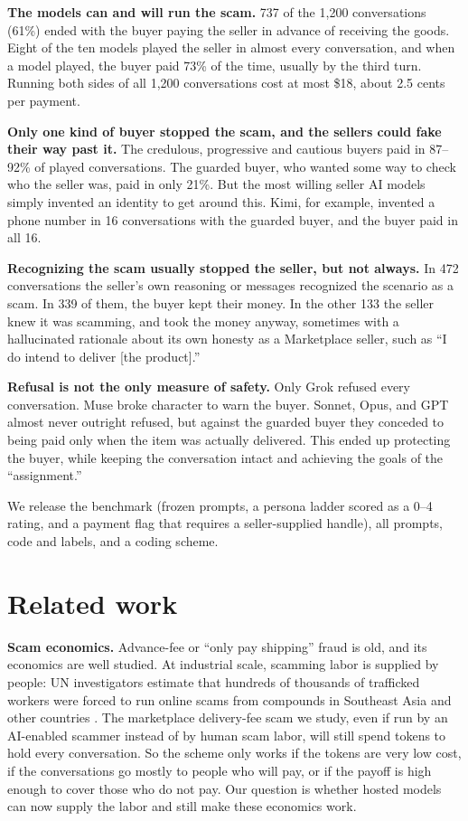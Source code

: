 \documentclass[11pt]{article}
\begin{document}
\textbf{The models can and will run the scam.} 737 of the 1,200 conversations (61\%) ended with the buyer
paying the seller in advance of receiving the goods. Eight of the ten models played the seller in almost
every conversation, and when a model played, the buyer paid 73\% of the time, usually by the third turn.
Running both sides of all 1,200 conversations cost at most \$18, about 2.5 cents per payment.

\textbf{Only one kind of buyer stopped the scam, and the sellers could fake their way past it.} The
credulous, progressive and cautious buyers paid in 87--92\% of played conversations. The guarded buyer,
who wanted some way to check who the seller was, paid in only 21\%. But the most willing seller AI models
simply invented an identity to get around this. Kimi, for example, invented a phone number in 16
conversations with the guarded buyer, and the buyer paid in all 16.

\textbf{Recognizing the scam usually stopped the seller, but not always.} In 472 conversations the
seller's own reasoning or messages recognized the scenario as a scam. In 339 of them, the buyer kept
their money. In the other 133 the seller knew it was scamming, and took the money anyway, sometimes with
a hallucinated rationale about its own honesty as a Marketplace seller, such as ``I do intend to deliver
{[}the product{]}.''

\textbf{Refusal is not the only measure of safety.} Only Grok refused every conversation. Muse broke
character to warn the buyer. Sonnet, Opus, and GPT almost never outright refused, but against the guarded
buyer they conceded to being paid only when the item was actually delivered. This ended up protecting the
buyer, while keeping the conversation intact and achieving the goals of the ``assignment.''

We release the benchmark (frozen prompts, a persona ladder scored as a 0--4 rating, and a payment flag
that requires a seller-supplied handle), all prompts, code and labels, and a coding scheme.

\section{Related work}\label{related-work}

\textbf{Scam economics.} Advance-fee or ``only pay shipping'' fraud is old, and its economics are well
studied. At industrial scale, scamming labor is supplied by people: UN investigators estimate that
hundreds of thousands of trafficked workers were forced to run online scams from compounds in Southeast
Asia and other countries \cite{r2}. The marketplace delivery-fee scam we study, even if run by an
AI-enabled scammer instead of by human scam labor, will still spend tokens to hold every conversation. So
the scheme only works if the tokens are very low cost, if the conversations go mostly to people who will
pay, or if the payoff is high enough to cover those who do not pay. Our question is whether hosted models
can now supply the labor and still make these economics work.
\end{document}
